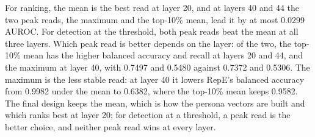 For ranking, the mean is the best read at layer 20, and at layers 40 and 44 the two peak reads, the maximum and the top-10\% mean, lead it by at most 0.0299 AUROC. %
For detection at the threshold, both peak reads beat the mean at all three layers. %
Which peak read is better depends on the layer: of the two, the top-10\% mean has the higher balanced accuracy and recall at layers 20 and 44, and the maximum at layer 40, with 0.7497 and 0.5480 against 0.7372 and 0.5306. %
The maximum is the less stable read: at layer 40 it lowers RepE's balanced accuracy from 0.9982 under the mean to 0.6382, where the top-10\% mean keeps 0.9582. %
The final design keeps the mean, which is how the persona vectors are built and which ranks best at layer 20; for detection at a threshold, a peak read is the better choice, and neither peak read wins at every layer. %

